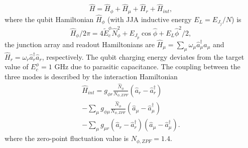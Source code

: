 \documentclass[%
reprint,
superscriptaddress,
 amsmath,amssymb,
 aps,
 prx,
longbibliography,
floatfix,
]{revtex4-2}
\begin{document}
\begin{equation}
   \hat H =\hat{H}_\phi + \hat{H}_\mu + \hat{H}_r + \hat{H}_{int},\label{Hamiltonian_total}
\end{equation}
where the qubit Hamiltonian $\hat{H}_\phi$ (with JJA inductive energy $E_L=E_{J_j}/N$) is 
\begin{equation}
\hat{H}_\phi / 2\pi = 4\tilde{E}^\phi_c \hat N_\phi^2+ E_{J_p}\cos{\hat\phi}+E_L\hat \phi^2 /2,
\end{equation}
the junction array and readout Hamiltonians are $\hat{H}_\mu = \sum_{\mu}\omega_\mu \hat a_\mu^\dagger \hat a_\mu$ and $\hat{H}_r = \omega_r \hat a_r^\dagger \hat a_r$, respectively. The qubit charging energy deviates from the target value of $E_c^{\phi}=1$ GHz due to parasitic capacitance. The coupling between the three modes is described by the interaction Hamiltonian
\begin{align}\label{eq:int_hamiltonian}
\hat{H}_{int} = g_{\phi r} \frac{\hat N_\phi}{{N_{\phi,ZPF}}} (\hat a_r-\hat a_r^\dagger)\nonumber \\ -\sum_{\mu} g_{\phi\mu} \frac{\hat N_\phi}{{N_{\phi,ZPF}}} (\hat a_\mu-\hat a_\mu^\dagger) \nonumber \\- \sum_{\mu} g_{\mu r} (\hat a_r-\hat a_r^\dagger)(\hat a_\mu-\hat a_\mu^\dagger).
\end{align}
where the zero-point fluctuation value is $N_{\phi,ZPF}=1.4$.


\end{document}
